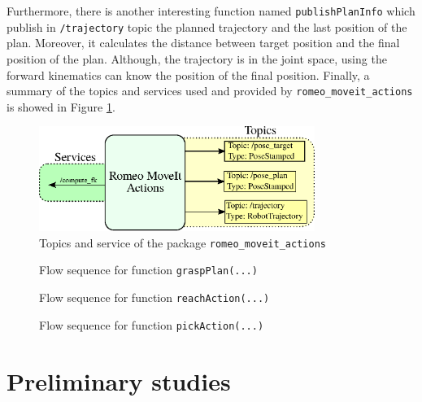 \documentclass[12pt,a4paper,final,twoside,openright]{report}
\begin{document}
Furthermore, there is another interesting function named \texttt{publishPlanInfo} which publish in \texttt{/trajectory} topic the planned trajectory and the last position of the plan. Moreover, it calculates the distance between target position and the final position of the plan. Although, the trajectory is in the joint space, using the forward kinematics can know the position of the final position. Finally, a summary of the topics and services used and provided by \texttt{romeo\_moveit\_actions} is showed in Figure \ref{fig:moveit_actions_ROS}. 

\begin{figure}[!h]
\centering
\includegraphics[width=0.8\textwidth]{images/moveit_actions_ROS.eps}
\caption{Topics and service of the package \texttt{romeo\_moveit\_actions}\label{fig:moveit_actions_ROS}}
\end{figure}

\begin{figure}[!h]
\centering

\caption{Flow sequence for function \texttt{graspPlan(...)}\label{fig:moveit_actions_grasp_plan}}
\end{figure}

\begin{figure}[!h]
\centering

\caption{Flow sequence for function \texttt{reachAction(...)}\label{fig:moveit_actions_reach_action}}
\end{figure}

\begin{figure}[!ħ]
\centering

\caption{Flow sequence for function \texttt{pickAction(...)}\label{fig:moveit_actions_pick_action}}
\end{figure}

\chapter{Preliminary studies}
\label{cha:pre_studies}
\end{document}
